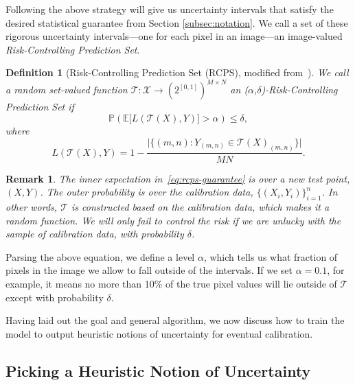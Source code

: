 \documentclass[10pt]{article}
\newtheorem{definition}{Definition}
\newtheorem{remark}{Remark}
\def\E{\mathbb{E}}
\newcommand{\X}{\mathcal{X}}
\newcommand{\T}{\mathcal{T}}
\renewcommand{\P}{\mathbb{P}}
\begin{document}
Following the above strategy will give us uncertainty intervals that satisfy
the desired statistical guarantee from Section \ref{subsec:notation}.
We call a set of these rigorous uncertainty intervals---one for each pixel in an image---an image-valued \emph{Risk-Controlling Prediction Set}.
\begin{definition}[Risk-Controlling Prediction Set (RCPS), modified from~\cite{bates2021distribution}]
    \label{def:rcps-formal}
    We call a random set-valued function $\T : \X \to \left(2^{[0,1]}\right)^{M \times N}$
    an \emph{($\alpha$,$\delta$)-Risk-Controlling Prediction Set} if 
    \begin{equation}
        \label{eq:rcps-guarantee}
        \P\left(\E\big[L(\T(X),Y)\big] > \alpha \right) \leq \delta,
    \end{equation}
    where 
    \begin{equation}
        L(\T(X),Y) = 1-\frac{\Big|\big\{(m,n) : Y_{(m,n)} \in \T(X)_{(m,n)}\big\}\Big|}{MN}.
    \end{equation}
\end{definition}
\begin{remark}
    The inner expectation in~\eqref{eq:rcps-guarantee} is over a new test point, $(X,Y)$.
    The outer probability is over the calibration data, $\big\{(X_i,Y_i)\big\}_{i=1}^n$.
    In other words, $\T$ is constructed based on the calibration data, which makes it a random function.
    We will only fail to control the risk if we are unlucky with the sample of calibration data, with probability $\delta$.
\end{remark}
Parsing the above equation, we define a level $\alpha$, which tells us what fraction of pixels in the image we allow to fall outside of the intervals. If we set $\alpha=0.1$, for example, it means no more than 10\% of the true pixel values will lie outside of $\T$ except with probability $\delta$.



Having laid out the goal and general algorithm, we now discuss how to train the model to output heuristic notions of uncertainty for eventual calibration.

\subsection{Picking a Heuristic Notion of Uncertainty}
\label{subsec:heuristics}
\end{document}
